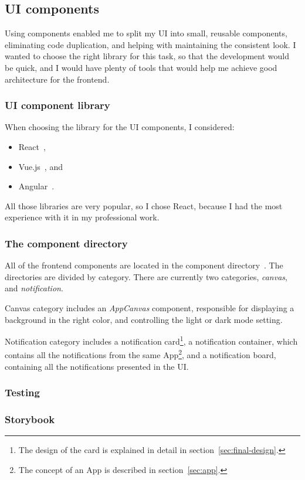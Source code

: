 \subsection{UI components}\label{sec:ui-components}

Using components enabled me to split my UI
into small, reusable components,
eliminating code duplication,
and helping with maintaining the consistent look.
I wanted to choose the right library
for this task,
so that the development would be quick,
and I would have plenty of tools
that would help me achieve
good architecture for the frontend.

\subsubsection{UI component library}\label{sec:ui-component-library}

When choosing the library for the UI components, I considered:

\begin{itemize}
  \item
        React~\cite{oshannessy_react_2022},
  \item
        Vue.js~\cite{you_vuejs_2022}, and
  \item
        Angular~\cite{kalpakas_angular_2022}.
\end{itemize}

All those libraries are very popular,
so I chose React,
because I had the most experience with it in my professional work.

\subsubsection{The component directory}\label{sec:the-component-directory}

All of the frontend components
are located in the component directory~\cite{sewera_notipie_2022-3}.
The directories are divided by category.
There are currently two categories,
\emph{canvas}, and
\emph{notification}.

Canvas category includes
an \emph{AppCanvas} component,
responsible for displaying
a background in the right color,
and controlling the light or dark mode setting.

Notification category includes
a notification card\footnote{
  The design of the card
  is explained in detail
  in section~\ref{sec:final-design}.
}, a notification container,
which contains all the notifications
from the same App\footnote{
  The concept of an App is described
  in section~\ref{sec:app}.
}, and a notification board,
containing all the notifications
presented in the UI.

\subsubsection{Testing}\label{sec:ui-testing}



\subsubsection{Storybook}\label{sec:storybook}
